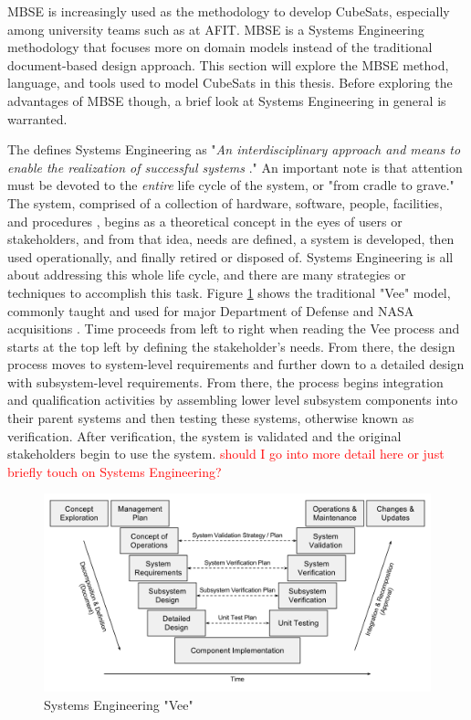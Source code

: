 MBSE is increasingly used as the methodology to develop CubeSats, especially among university teams such as at AFIT. MBSE is a Systems Engineering methodology that focuses more on domain models instead of the traditional document-based design approach. This section will explore the MBSE method, language, and tools used to model CubeSats in this thesis. Before exploring the advantages of MBSE though, a brief look at Systems Engineering in general is warranted. 

The  defines Systems Engineering as "\textit{An interdisciplinary approach and means to enable the realization of successful systems} \citep{Buede2016}." An important note is that attention must be devoted to the \textit{entire} life cycle of the system, or "from cradle to grave." The system, comprised of a collection of hardware, software, people, facilities, and procedures \citep{Buede2016}, begins as a theoretical concept in the eyes of users or stakeholders, and from that idea, needs are defined, a system is developed, then used operationally, and finally retired or disposed of. Systems Engineering is all about addressing this whole life cycle, and there are many strategies or techniques to accomplish this task. Figure \ref{fig:Systems Engineering "Vee"} shows the traditional "Vee" model, commonly taught and used for major Department of Defense and NASA acquisitions \citep{Buede2016}. Time proceeds from left to right when reading the Vee process and starts at the top left by defining the stakeholder's needs. From there, the design process moves to system-level requirements and further down to a detailed design with subsystem-level requirements. From there, the process begins integration and qualification activities by assembling lower level subsystem components into their parent systems and then testing these systems, otherwise known as verification. After verification, the system is validated and the original stakeholders begin to use the system. \textcolor{red}{should I go into more detail here or just briefly touch on Systems Engineering?}

\begin{figure}
    \centering
    \includegraphics[width=\textwidth]{Thesis/Literature_Review/Lit Review Figures/sysengvee.png}
    \caption{Systems Engineering "Vee"}
    \label{fig:Systems Engineering "Vee"}
\end{figure}

